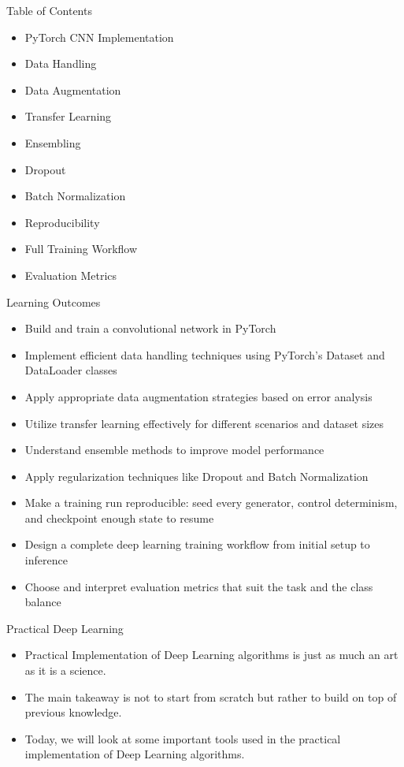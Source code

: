 \begin{frame}{Table of Contents}
\begin{itemize}
    \item PyTorch CNN Implementation
    \item Data Handling
    \item Data Augmentation
    \item Transfer Learning
    \item Ensembling
    \item Dropout
    \item Batch Normalization
    \item Reproducibility
    \item Full Training Workflow
    \item Evaluation Metrics
\end{itemize}
\end{frame}

\begin{frame}{Learning Outcomes}
\begin{itemize}
    \item Build and train a convolutional network in PyTorch
    \item Implement efficient data handling techniques using PyTorch's Dataset and DataLoader classes
    \item Apply appropriate data augmentation strategies based on error analysis
    \item Utilize transfer learning effectively for different scenarios and dataset sizes
    \item Understand ensemble methods to improve model performance
    \item Apply regularization techniques like Dropout and Batch Normalization
    \item Make a training run reproducible: seed every generator, control determinism, and checkpoint enough state to resume
    \item Design a complete deep learning training workflow from initial setup to inference
    \item Choose and interpret evaluation metrics that suit the task and the class balance
\end{itemize}
\end{frame}

\begin{frame}{Practical Deep Learning}
\begin{itemize}
    \item Practical Implementation of Deep Learning algorithms is just as much an art as it is a science.
    \item The main takeaway is not to start from scratch but rather to build on top of previous knowledge.
    \item Today, we will look at some important tools used in the practical implementation of Deep Learning algorithms.
\end{itemize}
\end{frame} 
